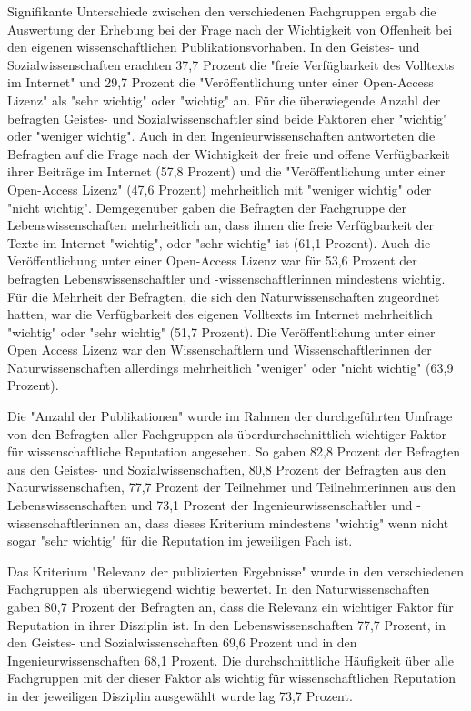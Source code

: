 Signifikante Unterschiede zwischen den verschiedenen Fachgruppen ergab die Auswertung der Erhebung bei der Frage nach der Wichtigkeit von Offenheit bei den eigenen wissenschaftlichen Publikationsvorhaben. In den Geistes- und Sozialwissenschaften erachten 37,7 Prozent die "freie Verfügbarkeit des Volltexts im Internet" und 29,7 Prozent die "Veröffentlichung unter einer Open-Access Lizenz" als "sehr wichtig" oder "wichtig" an. Für die überwiegende Anzahl der befragten Geistes- und Sozialwissenschaftler sind beide Faktoren eher "wichtig" oder "weniger wichtig". Auch in den Ingenieurwissenschaften antworteten die Befragten auf die Frage nach der Wichtigkeit der freie und offene Verfügbarkeit ihrer Beiträge im Internet (57,8 Prozent) und die "Veröffentlichung unter einer Open-Access Lizenz" (47,6 Prozent) mehrheitlich mit "weniger wichtig" oder "nicht wichtig". Demgegenüber gaben die Befragten der Fachgruppe der Lebenswissenschaften mehrheitlich an, dass ihnen die freie Verfügbarkeit der Texte im Internet "wichtig", oder "sehr wichtig" ist (61,1 Prozent). Auch die Veröffentlichung unter einer Open-Access Lizenz war für 53,6 Prozent der befragten Lebenswissenschaftler und -wissenschaftlerinnen mindestens wichtig. Für die Mehrheit der Befragten, die sich den Naturwissenschaften zugeordnet hatten, war die Verfügbarkeit des eigenen Volltexts im Internet mehrheitlich "wichtig" oder "sehr wichtig" (51,7 Prozent). Die Veröffentlichung unter einer Open Access Lizenz war den Wissenschaftlern und Wissenschaftlerinnen der Naturwissenschaften allerdings mehrheitlich "weniger" oder "nicht wichtig" (63,9 Prozent).

Die "Anzahl der Publikationen" wurde im Rahmen der durchgeführten Umfrage von den Befragten aller Fachgruppen als überdurchschnittlich wichtiger Faktor für wissenschaftliche Reputation angesehen. So gaben 82,8 Prozent der Befragten aus den Geistes- und Sozialwissenschaften, 80,8 Prozent der Befragten aus den Naturwissenschaften, 77,7 Prozent der Teilnehmer und Teilnehmerinnen aus den Lebenswissenschaften und 73,1 Prozent der Ingenieurwissenschaftler und -wissenschaftlerinnen an, dass dieses Kriterium mindestens "wichtig" wenn nicht sogar "sehr wichtig" für die Reputation im jeweiligen Fach ist.

Das Kriterium "Relevanz der publizierten Ergebnisse" wurde in den verschiedenen Fachgruppen als überwiegend wichtig bewertet. In den Naturwissenschaften gaben 80,7 Prozent der Befragten an, dass die Relevanz ein wichtiger Faktor für Reputation in ihrer Disziplin ist. In den Lebenswissenschaften 77,7 Prozent, in den Geistes- und Sozialwissenschaften 69,6 Prozent und in den Ingenieurwissenschaften 68,1 Prozent. Die durchschnittliche Häufigkeit über alle Fachgruppen mit der dieser Faktor als wichtig für wissenschaftlichen Reputation in der jeweiligen Disziplin ausgewählt wurde lag 73,7 Prozent.

